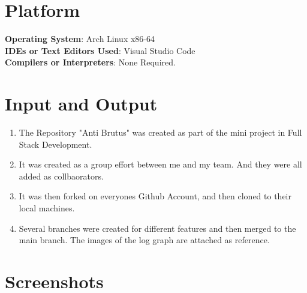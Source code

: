 \documentclass[11pt]{article}
\begin{document}
\section{Platform}
\textbf{Operating System}: Arch Linux x86-64 \\
\textbf{IDEs or Text Editors Used}: Visual Studio Code\\
\textbf{Compilers or Interpreters}: None Required. \\

\section{Input and Output}

\begin{enumerate}
    \item The Repository "Anti Brutus" was created as part of the mini project in Full Stack Development.
    \item It was created as a group effort between me and my team. And they were all added as collbaorators. 
    \item It was then forked on everyones Github Account, and then cloned to their local machines.
    \item Several branches were created for different features and then merged to the main branch. The images of the log graph are attached as reference. 
\end{enumerate}

\section{Screenshots}



\end{document}
